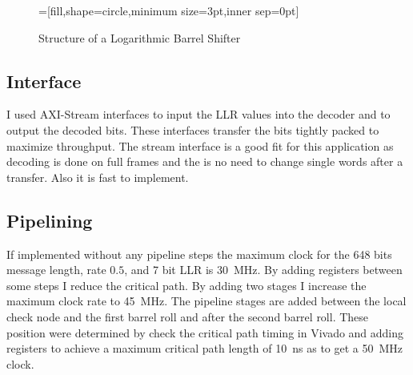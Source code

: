 \begin{figure}
    =[fill,shape=circle,minimum size=3pt,inner sep=0pt]
    \centering
    \caption{Structure of a Logarithmic Barrel Shifter}
    \label{log_shift}
\end{figure}

\subsection{Interface}
I used AXI-Stream interfaces to input the LLR values into the decoder and to output the decoded bits. These interfaces transfer the bits tightly packed to maximize throughput. The stream interface is a good fit for this application as decoding is done on full frames and the is no need to change single words after a transfer. Also it is fast to implement.

\subsection{Pipelining}
If implemented without any pipeline steps the maximum clock for the 648 bits message length, rate $0.5$, and 7 bit LLR is \SI{30}{\mega\hertz}. By adding registers between some steps I reduce the critical path. By adding two stages I increase the maximum clock rate to \SI{45}{\mega\hertz}. The pipeline stages are added between the local check node and the first barrel roll and after the second barrel roll. These position were determined by check the critical path timing in Vivado and adding registers to achieve a maximum critical path length of \SI{10}{\nano\second} as to get a \SI{50}{\mega\hertz} clock. 

